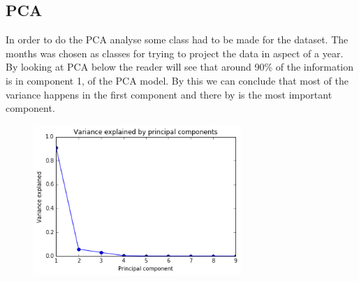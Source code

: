\subsection{PCA}
In order to do the PCA analyse some class had to be made for the dataset. The months was chosen as classes for trying to project the data in aspect of a year. 
By looking at PCA below the reader will see that around 90\% of the information is in component 1, of the PCA model. By this we can conclude that most of the variance happens in the first component and there by is the most important component. 

\vspace{-5pt}
\begin{figure}[!ht]
	\centering
	\includegraphics[width=0.7\textwidth]{fig/pca/pca_2.png}
	\vspace{-5pt}
\end{figure}